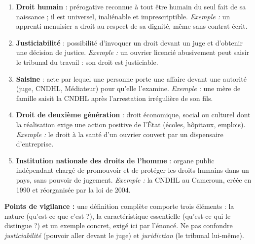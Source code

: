 \documentclass[11pt]{article}
\begin{document}
\begin{corrige}
\begin{enumerate}
\item \textbf{Droit humain} : prérogative reconnue à tout être humain du seul fait de sa naissance ; il est universel, inaliénable et imprescriptible. \emph{Exemple :} un apprenti menuisier a droit au respect de sa dignité, même sans contrat écrit.
\item \textbf{Justiciabilité} : possibilité d'invoquer un droit devant un juge et d'obtenir une décision de justice. \emph{Exemple :} un ouvrier licencié abusivement peut saisir le tribunal du travail : son droit est justiciable.
\item \textbf{Saisine} : acte par lequel une personne porte une affaire devant une autorité (juge, CNDHL, Médiateur) pour qu'elle l'examine. \emph{Exemple :} une mère de famille saisit la CNDHL après l'arrestation irrégulière de son fils.
\item \textbf{Droit de deuxième génération} : droit économique, social ou culturel dont la réalisation exige une action positive de l'État (écoles, hôpitaux, emplois). \emph{Exemple :} le droit à la santé d'un ouvrier couvert par un dispensaire d'entreprise.
\item \textbf{Institution nationale des droits de l'homme} : organe public indépendant chargé de promouvoir et de protéger les droits humains dans un pays, sans pouvoir de jugement. \emph{Exemple :} la CNDHL au Cameroun, créée en 1990 et réorganisée par la loi de 2004.
\end{enumerate}

\textbf{Points de vigilance :} une définition complète comporte trois éléments : la nature (qu'est-ce que c'est ?), la caractéristique essentielle (qu'est-ce qui le distingue ?) et un exemple concret, exigé ici par l'énoncé. Ne pas confondre \emph{justiciabilité} (pouvoir aller devant le juge) et \emph{juridiction} (le tribunal lui-même).
\end{corrige}
\end{document}
